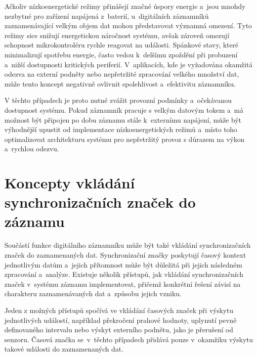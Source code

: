 Ačkoliv nízkoenergetické režimy přinášejí značné úspory energie a~jsou mnohdy nezbytné pro zařízení napájená z~baterií, u~digitálních záznamníků zaznamenávající velkým objem dat mohou představovat významná omezení. Tyto režimy sice snižují energetickou náročnost systému, avšak zároveň omezují schopnost mikrokontroléru rychle reagovat na události. Spánkové stavy, které minimalizují spotřebu energie, často vedou k~delšímu zpoždění při probuzení a~nižší dostupnosti kritických periferií. V~aplikacích, kde je vyžadována okamžitá odezva na externí podněty nebo nepřetržité zpracování velkého množství dat, může tento koncept negativně ovlivnit spolehlivost a~efektivitu záznamníku.~\cite{embedded_low_power_modes}

V těchto případech je proto nutné zvážit provozní podmínky a~očekávanou dostupnost systému. Pokud záznamník pracuje s velkým datovým tokem a~má možnost být připojen po dobu záznamu stále k~externímu napájení, může být výhodnější upustit od implementace nízkoenergetických režimů a~místo toho optimalizovat architekturu systému pro nepřetržitý provoz s důrazem na výkon a~rychlou odezvu.~\cite{analog_devices_low_power_modes}


\section{Koncepty vkládání synchronizačních značek do záznamu} 
\label{casove_znacky}
Součástí funkce digitálního záznamníku může být také vkládání synchronizačních značek do zaznamenaných dat. Synchronizační značky poskytují časový kontext jednotlivým datům a~jejich přítomnost může být důležitá při jejich následném zpracování a~analýze. Existuje několik přístupů, jak vkládání synchronizačních značek v~systému záznamu implementovat, přičemž konkrétní řešení závisí na charakteru zaznamenávaných dat a~způsobu jejich vzniku.~\cite{researchgate_general_dataloggger_multiple_sdcards, perny2008zarizeni_cas_znacky}

Jeden z možných přístupů spočívá ve vkládání časových značek při výskytu jednotlivých událostí, například překročení prahové hodnoty, uplynutí pevně definovaného intervalu nebo výskyt externího podnětu, jako je přerušení od senzoru. Časová značka se~v~těchto případech přidává pouze v~okamžiku výskytu takové události do zaznamenaných dat.~\cite{researchgate_general_dataloggger_multiple_sdcards, ieee_multi_connectivity_datalogger_sd_card}

